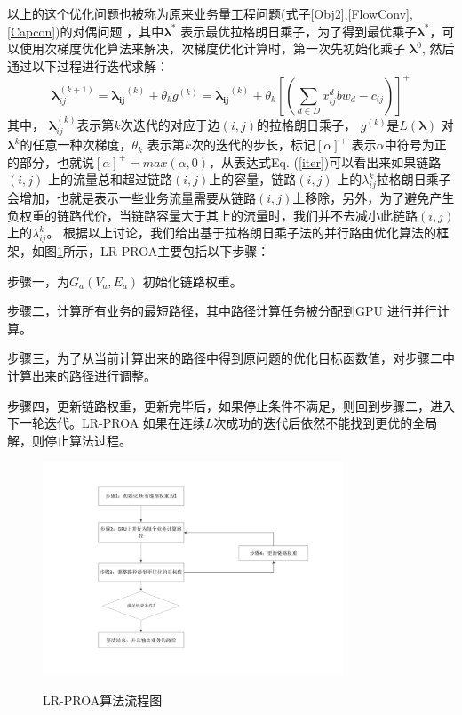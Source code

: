 以上的这个优化问题也被称为原来业务量工程问题(式子\ref{Obj2},\ref{FlowConv},\ref{Capcon})的对偶问题 ，其中$\mathbf{\lambda^*}$ 表示最优拉格朗日乘子，为了得到最优乘子$\mathbf{\lambda^*}$，可以使用次梯度优化算法来解决，次梯度优化计算时，第一次先初始化乘子 $\mathbf{\lambda}^0$, 然后通过以下过程进行迭代求解：
\begin{equation}\label{iter}
\mathbf{\lambda}_{ij}^{(k+1)} =\mathbf{\lambda_{ij}}^{(k)}+\theta_{k} g^{(k)}= \mathbf{\lambda_{ij}}^{(k)} + \theta_k[(\sum\limits_{d \in D}x_{ij}^d bw_d- c_{ij})]^+
\end{equation}
其中， $\mathbf{\lambda}_{ij}^{(k)}$表示第$k$次迭代的对应于边$(i,j)$的拉格朗日乘子， $g^{(k)}$是$L(\mathbf{\lambda})$ 对$\mathbf{\lambda}^{k}$的任意一种次梯度，$\theta_k$ 表示第$k$次的迭代的步长，标记$[\alpha]^+$ 表示$\alpha$中符号为正的部分，也就说$[\alpha]^+=max(\alpha, 0)$，从表达式Eq. (\ref{iter})可以看出来如果链路$(i,j)$ 上的流量总和超过链路$(i,j)$上的容量，链路$(i,j)$ 上的$\lambda_{ij}^k$拉格朗日乘子会增加，也就是表示一些业务流量需要从链路$(i,j)$上移除，另外，为了避免产生负权重的链路代价，当链路容量大于其上的流量时，我们并不去减小此链路$(i,j)$上的$\lambda_{ij}^k$。
根据以上讨论，我们给出基于拉格朗日乘子法的并行路由优化算法的框架，如图\ref{lpl}所示，LR-PROA主要包括以下步骤：

步骤一，为$G_a(V_a, E_a)$ 初始化链路权重。

步骤二，计算所有业务的最短路径，其中路径计算任务被分配到GPU 进行并行计算。

步骤三，为了从当前计算出来的路径中得到原问题的优化目标函数值，对步骤二中计算出来的路径进行调整。

步骤四，更新链路权重，更新完毕后，如果停止条件不满足，则回到步骤二，进入下一轮迭代。LR-PROA 如果在连续$L$次成功的迭代后依然不能找到更优的全局解，则停止算法过程。
\begin{figure}
\begin{center}
{\includegraphics[width=0.8\textwidth]{figures/lagrange.pdf}}
\end{center}
\caption{{\footnotesize{LR-PROA算法流程图}}}
\label{lpl}
\end{figure}
